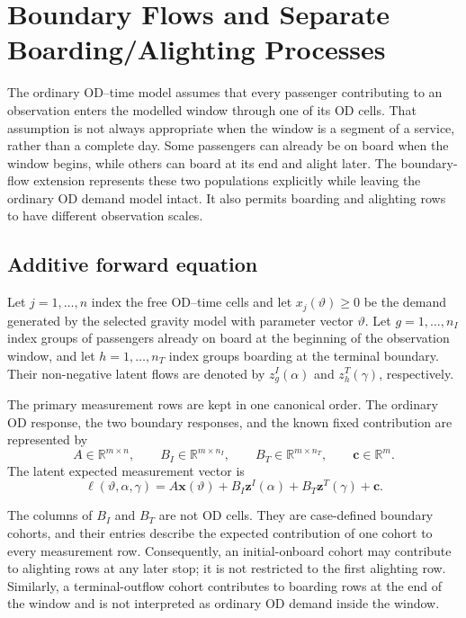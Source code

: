 
\section{Boundary Flows and Separate Boarding/Alighting Processes}
\label{sec:boundary-flow-observation-processes}

The ordinary OD--time model assumes that every passenger contributing to an
observation enters the modelled window through one of its OD cells.  That
assumption is not always appropriate when the window is a segment of a
service, rather than a complete day.  Some passengers can already be on board
when the window begins, while others can board at its end and alight later.
The boundary-flow extension represents these two populations explicitly while
leaving the ordinary OD demand model intact.  It also permits boarding and
alighting rows to have different observation scales.

\subsection{Additive forward equation}

Let $j=1,\ldots,n$ index the free OD--time cells and let
$x_j(\vartheta)\geq 0$ be the demand generated by the selected gravity model
with parameter vector $\vartheta$.  Let $g=1,\ldots,n_I$ index groups of
passengers already on board at the beginning of the observation window, and
let $h=1,\ldots,n_T$ index groups boarding at the terminal boundary.  Their
non-negative latent flows are denoted by
$z^{I}_g(\alpha)$ and $z^{T}_h(\gamma)$, respectively.

The primary measurement rows are kept in one canonical order.  The ordinary
OD response, the two boundary responses, and the known fixed contribution are
represented by
\[
 A\in\mathbb{R}^{m\times n},\qquad
 B_I\in\mathbb{R}^{m\times n_I},\qquad
 B_T\in\mathbb{R}^{m\times n_T},\qquad
 \bm c\in\mathbb{R}^{m}.
\]
The latent expected measurement vector is
\begin{equation}
  \bm\ell(\vartheta,\alpha,\gamma)
   = A\bm x(\vartheta)
     +B_I\bm z^{I}(\alpha)
     +B_T\bm z^{T}(\gamma)
     +\bm c.
  \label{eq:boundary-additive-latent-measurements}
\end{equation}

The columns of $B_I$ and $B_T$ are not OD cells.  They are case-defined
boundary cohorts, and their entries describe the expected contribution of one
cohort to every measurement row.  Consequently, an initial-onboard cohort
may contribute to alighting rows at any later stop; it is not restricted to
the first alighting row.  Similarly, a terminal-outflow cohort contributes to
boarding rows at the end of the window and is not interpreted as ordinary
OD demand inside the window.

